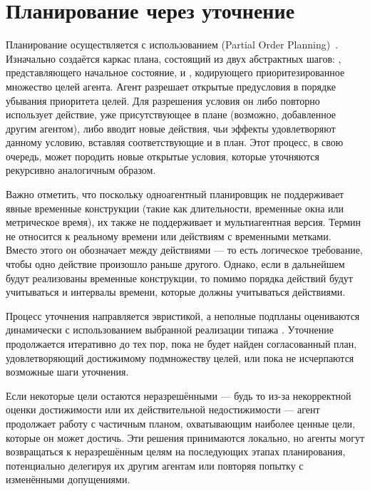 \section{Планирование через уточнение}

Планирование осуществляется с использованием
(Partial Order Planning)~\cite{Weld_1994,BENTON2009562}.
Изначально создаётся каркас плана, состоящий из двух абстрактных шагов:
, представляющего начальное состояние,
и , кодирующего приоритезированное множество целей агента.
Агент разрешает открытые предусловия  в порядке убывания приоритета целей.
Для разрешения условия он либо повторно использует действие,
уже присутствующее в плане (возможно, добавленное другим агентом),
либо вводит новые действия, чьи эффекты удовлетворяют данному условию,
вставляя соответствующие  и  в план.
Этот процесс, в свою очередь, может породить новые открытые условия,
которые уточняются рекурсивно аналогичным образом.

Важно отметить, что поскольку
одноагентный планировщик не поддерживает явные временные конструкции
(такие как длительности, временные окна или метрическое время),
их также не поддерживает и мультиагентная версия.
Термин 
не относится к реальному времени или действиям с временными метками.
Вместо этого он обозначает  между действиями ---
то есть логическое требование, чтобы одно действие произошло раньше другого.
Однако, если в дальнейшем будут реализованы временные конструкции,
то помимо порядка действий будут учитываться и интервалы времени,
которые должны учитываться действиями.

Процесс уточнения направляется эвристикой,
а неполные подпланы оцениваются динамически
с использованием выбранной реализации типажа .
Уточнение продолжается итеративно до тех пор,
пока не будет найден согласованный план,
удовлетворяющий достижимому подмножеству целей,
или пока не исчерпаются возможные шаги уточнения.

Если некоторые цели остаются неразрешёнными
--- будь то из-за некорректной оценки достижимости или их действительной недостижимости ---
агент продолжает работу с частичным планом,
охватывающим наиболее ценные цели, которые он может достичь.
Эти решения принимаются локально,
но агенты могут возвращаться к неразрешённым целям на последующих этапах планирования,
потенциально делегируя их другим агентам или повторяя попытку с изменёнными допущениями.


